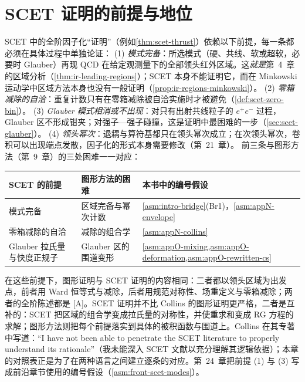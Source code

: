 \section{SCET 证明的前提与地位}\label{sec:scet-status}

\begin{remark}\label{rem:scet-assumptions}
SCET 中的全阶因子化“证明”（例如\cref{thm:scet-thrust}）依赖以下前提，每一条都必须在具体过程中单独论证：
(1) \emph{模式完备}：所选模式（硬、共线、软或超软，必要时 Glauber）再现 QCD 在给定观测量下的全部领头红外区域。这\emph{就是}第~4~章的区域分析（\cref{thm:ir-leading-regions}）；SCET 本身不能证明它，而在 Minkowski 运动学中区域方法本身也没有一般证明（\cref{prop:ir-regions-minkowski}）。
(2) \emph{零箱减除的自洽}：重复计数只有在零箱减除被自洽实施时才被避免（\cref{def:scet-zero-bin}）。
(3) \emph{Glauber 模式相消或不出现}：对只有出射共线粒子的 $e^+e^-$ 过程，Glauber 区不形成钳夹；对强子—强子碰撞，这是证明中最困难的一步（\cref{sec:scet-glauber}）。
(4) \emph{领头幂次}：退耦与算符基都只在领头幂次成立；在次领头幂次，卷积可以出现端点发散，因子化的形式本身需要修改（第~21~章）。
前三条与图形方法（第~9~章）的三处困难一一对应：
\begin{center}\small
\renewcommand{\arraystretch}{1.15}
\begin{tabular}{@{}lll@{}}
\toprule
SCET 的前提 & 图形方法的困难 & 本书中的编号假设 \\
\midrule
模式完备 & 区域完备与幂次计数 & \cref{asm:intro-bridge}(Br1)，\cref{asm:appN-envelope} \\
零箱减除的自洽 & 减除的组合学 & \cref{asm:appN-collins} \\
Glauber 拉氏量与快度正规子 & Glauber 区的围道变形 & \cref{asm:appO-mixing,asm:appO-deformation,asm:appO-rewritten-cs} \\
\bottomrule
\end{tabular}
\end{center}
在这些前提下，图形证明与 SCET 证明的内容相同：二者都以领头区域为出发点，前者用 Ward 恒等式与减除，后者用规范对称性、场重定义与零箱减除；两者的全阶陈述都是 [A]。SCET 证明并不比 Collins 的图形证明更严格，二者是互补的：SCET 把区域的组合学变成拉氏量的对称性，并使重求和变成 RG 方程的求解；图形方法则把每个前提落实到具体的被积函数与围道上。Collins 在其专著中写道：“I have not been able to penetrate the SCET literature to properly understand its rationale”（我未能深入 SCET 文献以充分理解其逻辑依据）\cite[第~15.9~节]{Collins2011}；本章的对照表正是为了在两种语言之间建立逐条的对应。第~24~章把前提 (1) 与 (3) 写成前沿章节使用的编号假设（\cref{asm:front-scet-modes}）。
\end{remark}

